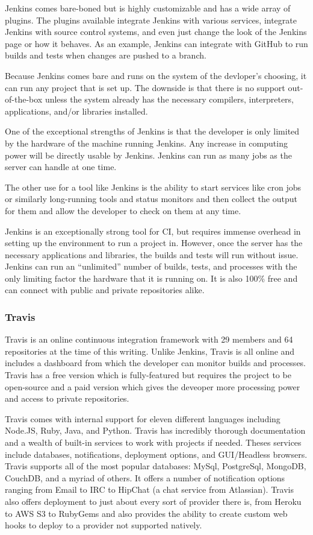 \documentclass[11pt]{article}
\begin{document}
Jenkins comes bare-boned but is highly customizable and has a wide array of plugins. The plugins available integrate Jenkins with various services, integrate Jenkins with source control systems, and even just change the look of the Jenkins page or how it behaves. As an example, Jenkins can integrate with GitHub to run builds and tests when changes are pushed to a branch.

Because Jenkins comes bare and runs on the system of the devloper's choosing, it can run any project that is set up. The downside is that there is no support out-of-the-box unless the system already has the necessary compilers, interpreters, applications, and/or libraries installed.

One of the exceptional strengths of Jenkins is that the developer is only limited by the hardware of the machine running Jenkins. Any increase in computing power will be directly usable by Jenkins. Jenkins can run as many jobs as the server can handle at one time.

The other use for a tool like Jenkins is the ability to start services like cron jobs or similarly long-running tools and status monitors and then collect the output for them and allow the developer to check on them at any time.

Jenkins is an exceptionally strong tool for CI, but requires immense overhead in setting up the environment to run a project in. However, once the server has the necessary applications and libraries, the builds and tests will run without issue. Jenkins can run an ``unlimited'' number of builds, tests, and processes with the only limiting factor the hardware that it is running on. It is also 100\% free and can connect with public and private repositories alike.

\subsubsection{Travis \cite{Travis}}
Travis is an online continuous integration framework with 29 members and 64 repositories at the time of this writing. Unlike Jenkins, Travis is all online and includes a dashboard from which the developer can monitor builds and processes. Travis has a free version which is fully-featured but requires the project to be open-source and a paid version which gives the deveoper more processing power and access to private repositories.

Travis comes with internal support for eleven different languages including Node.JS, Ruby, Java, and Python. Travis has incredibly thorough documentation and a wealth of built-in services to work with projects if needed. Theses services include databases, notifications, deployment options, and GUI/Headless browsers. Travis supports all of the most popular databases: MySql, PostgreSql, MongoDB, CouchDB, and a myriad of others. It offers a number of notification options ranging from Email to IRC to HipChat (a chat service from Atlassian). Travis also offers deployment to just about every sort of provider there is, from Heroku to AWS S3 to RubyGems and also provides the ability to create custom web hooks to deploy to a provider not supported natively.
\end{document}
